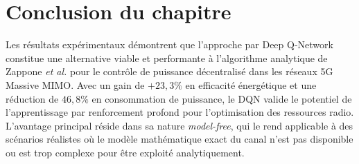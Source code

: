 \documentclass[conference]{IEEEtran}
\begin{document}
\section{Conclusion du chapitre}

Les résultats expérimentaux démontrent que l'approche par Deep Q-Network constitue une alternative viable et performante à l'algorithme analytique de Zappone \textit{et al.} pour le contrôle de puissance décentralisé dans les réseaux 5G Massive MIMO. Avec un gain de $+23{,}3\%$ en efficacité énergétique et une réduction de $46{,}8\%$ en consommation de puissance, le DQN valide le potentiel de l'apprentissage par renforcement profond pour l'optimisation des ressources radio. L'avantage principal réside dans sa nature \textit{model-free}, qui le rend applicable à des scénarios réalistes où le modèle mathématique exact du canal n'est pas disponible ou est trop complexe pour être exploité analytiquement.

%
%
%
%
%
%
%
\end{document}
